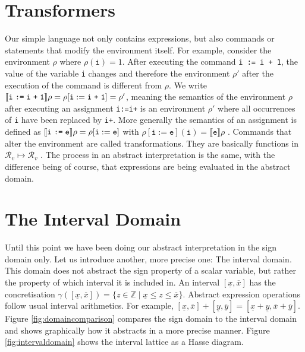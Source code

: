 \section{Transformers}

Our simple language not only contains expressions, but also commands or statements that modify the environment itself. For example, consider the environment $\rho$ where $\rho(\mathtt{i})=1$. After executing the command \texttt{i := i + 1}, the value of the variable \texttt{i} changes and therefore the environment $\rho'$ after the execution of the command is different from $\rho$. We write $\llbracket \texttt{i\;:=\;i\;+\;1} \rrbracket\rho=\rho[\mathtt{i}:=\texttt{i\;+\;1}]=\rho'$, meaning the semantics of the environment $\rho$ after executing an assignment \texttt{i\;:=\;i\;+} is an environment $\rho'$ where all occurrences of \texttt{i} have been replaced by \texttt{i\;+}. 
More generally the semantics of an assignment is defined as $\llbracket \texttt{i\;:=\;e} \rrbracket\rho=\rho[\mathtt{i}:=\texttt{e}]$ with $\rho[\mathtt{i}:=\texttt{e}](\mathtt{i})=\llbracket\mathtt{e}\rrbracket\rho$ \cite{cousot2011}. Commands that alter the environment are called transformations. They are basically functions in $\mathcal{R}_v\mapsto\mathcal{R}_v$ \cite{scott1971}.
The process in an abstract interpretation is the same, with the difference being of course, that expressions are being evaluated in the abstract domain.

\section{The Interval Domain}





Until this point we have been doing our abstract interpretation in the sign domain only. Let us introduce another, more precise one: The interval domain. This domain does not abstract the sign property of a scalar variable, but rather the property of which interval it is included in. An interval $[\underline{x},\overline{x}]$ has the concretisation $\gamma([\underline{x},\overline{x}])=\{z\in\mathbb{Z} \;|\; \underline{x}\leq z \leq \overline{x}\}$. Abstract expression operations follow usual interval arithmetics. For example, $[\underline{x},\overline{x}]+[\underline{y},\overline{y}]=[\underline{x}+\underline{y},\overline{x}+\overline{y}]$. Figure \ref{fig:domaincomparison} compares the sign domain to the interval domain and shows graphically how it abstracts in a more precise manner. Figure \ref{fig:intervaldomain} shows the interval lattice as a Hasse diagram.



